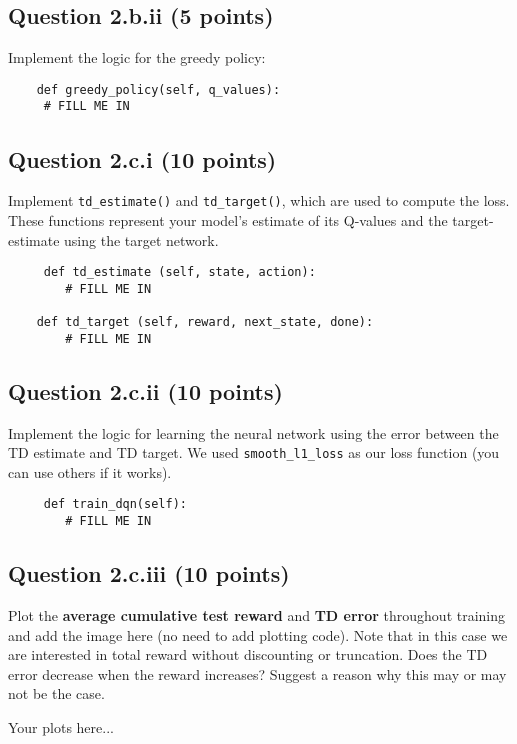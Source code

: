 \documentclass[12pt]{article}
\begin{document}
\subsection*{Question 2.b.ii (5 points)} 
Implement the logic for the greedy policy:
\begin{solution}
    \begin{verbatim}
    def greedy_policy(self, q_values):
     # FILL ME IN
    \end{verbatim}
\end{solution}



\subsection*{Question 2.c.i (10 points)} Implement \texttt{td\_estimate()} and \texttt{td\_target()}, which are used to compute the loss. These functions represent your model's estimate of its Q-values and the target-estimate using the target network. 

\begin{solution}
    \begin{verbatim}
     def td_estimate (self, state, action):
        # FILL ME IN

    def td_target (self, reward, next_state, done):
        # FILL ME IN
    \end{verbatim}
\end{solution}

\subsection*{Question 2.c.ii (10 points)} Implement the logic for learning the neural network using the error between the TD estimate and TD target. We used \texttt{smooth\_l1\_loss} as our loss function (you can use others if it works).

\begin{solution}
    \begin{verbatim}
     def train_dqn(self):
        # FILL ME IN
    \end{verbatim}
\end{solution}

\subsection*{Question 2.c.iii (10 points)} Plot the \textbf{average cumulative test reward} and \textbf{TD error} throughout training and add the image here (no need to add plotting code). Note that in this case we are interested in total reward without discounting or truncation. Does the TD error decrease when the reward increases? Suggest a reason why this may or may not be the case.
\begin{solution}
Your plots here...
\end{solution}
\end{document}

